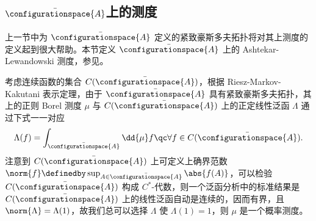 		\subsection{\texorpdfstring{$\bar{\configurationspace{A}}$上的测度}{量子位型空间上的测度}}

			上一节中为 $\bar{\configurationspace{A}}$ 定义的紧致豪斯多夫拓扑将对其上测度的定义起到很大帮助。本节定义 $\bar{\configurationspace{A}}$ 上的 Ashtekar-Lewandowski 测度，参见\cite{Ashtekar1994,Thiemann0210094,Thiemann2007}。

			考虑连续函数的集合 $C(\bar{\configurationspace{A}})$，根据 Riesz-Markov-Kakutani 表示定理，由于 $\bar{\configurationspace{A}}$ 具有紧致豪斯多夫拓扑，其上的正则 Borel 测度 $\mu$ 与 $C(\bar{\configurationspace{A}})$ 上的正定线性泛函 $\Lambda$ 通过下式一一对应
			\begin{equation}
				\Lambda(f) = \int_{\bar{\configurationspace{A}}} \dd{\mu} f \qc \forall f \in C(\bar{\configurationspace{A}}).
			\end{equation}
			注意到 $C(\bar{\configurationspace{A}})$ 上可定义上确界范数 $\norm{f} \definedby \sup_{A \in \bar{\configurationspace{A}}} \abs{f(A)}$，可以检验 $C(\bar{\configurationspace{A}})$ 构成 $C^*$-代数，则一个泛函分析中的标准结果是 $C(\bar{\configurationspace{A}})$ 上的线性泛函自动是连续的，因而有界，且 $\norm{\Lambda} = \Lambda(1)$，故我们总可以选择 $\Lambda$ 使 $\Lambda(1)=1$，则 $\mu$ 是一个概率测度。

